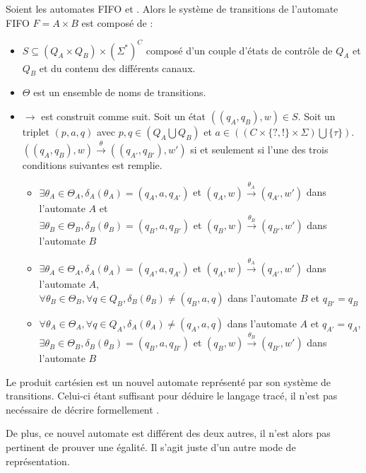 Soient les automates FIFO \fifoA et \fifoB. Alors le système de transitions \tsys de l'automate FIFO $F=A\times B$ est composé de :
\begin{itemize}
  \item $S \subseteq (Q_A\times Q_B)\times (\Sigma^*)^C$ composé d'un couple d'états de contrôle de $Q_A$ et $Q_B$ et du contenu des différents canaux.
  \item $\Theta$ est un ensemble de noms de transitions.
  \item $\rightarrow$ est construit comme suit. Soit un état $((q_A,q_B), w)\in S$. Soit un triplet $(p,a,q)$ avec $p,q \in (Q_A \bigcup Q_B)$ et $a \in ((C \times \{?,!\} \times \Sigma) \bigcup \{\tau\})$.
  $((q_A,q_B),w)\xrightarrow{\theta}((q_{A'},q_{B'}),w')$ si et seulement si l'une des trois conditions suivantes est remplie.
  \begin{itemize}
    \item $\exists \theta_A\in\Theta_A, \delta_A(\theta_A)=(q_A,a,q_{A'})$ et  $(q_A,w)\xrightarrow{\theta_A}(q_{A'},w')$ dans l'automate $A$ et\\ $\exists \theta_B\in\Theta_B, \delta_B(\theta_B)=(q_B,a,q_{B'})$ et $(q_B,w)\xrightarrow{\theta_B}(q_{B'},w')$ dans l'automate $B$
    \item $\exists \theta_A\in\Theta_A, \delta_A(\theta_A)=(q_A,a,q_{A'})$ et  $(q_A,w)\xrightarrow{\theta_A}(q_{A'},w')$ dans l'automate $A$,\\
    $\forall \theta_B\in\Theta_B,\forall q \in Q_B,\delta_B(\theta_B)\neq(q_B,a,q)$ dans l'automate $B$ et $q_{B'}=q_B$
    \item $\forall \theta_A\in\Theta_A,\forall q \in Q_A,\delta_A(\theta_A)\neq(q_A,a,q)$ dans l'automate $A$ et $q_{A'}=q_A$,\\
    $\exists \theta_B\in\Theta_B, \delta_B(\theta_B)=(q_B,a,q_{B'})$ et  $(q_B,w)\xrightarrow{\theta_B}(q_{B'},w')$ dans l'automate $B$
  \end{itemize}
\end{itemize}

Le produit cartésien est un nouvel automate représenté par son système de transitions. Celui-ci étant suffisant pour déduire le langage tracé, il n'est pas necéssaire de décrire formellement \fifo.

De plus, ce nouvel automate est différent des deux autres, il n'est alors pas pertinent de prouver une égalité. Il s'agit juste d'un autre mode de représentation.


